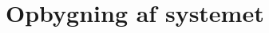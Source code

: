 \documentclass[smaller]{beamer}
\begin{document}
%   






\section{Opbygning af systemet}
\end{document}
